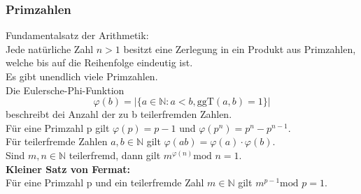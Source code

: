 \documentclass[a4paper,12pt]{article}
\begin{document}
\subsubsection{Primzahlen}
Fundamentalsatz der Arithmetik:\\
Jede natürliche Zahl $n>1$ besitzt eine Zerlegung in ein Produkt aus Primzahlen, welche bis auf die Reihenfolge eindeutig ist.\\
Es gibt unendlich viele Primzahlen.\\

Die Eulersche-Phi-Funktion $$\varphi (b)=|\{a\in\mathbb{N} : a < b, \textrm{ggT}(a,b)=1\}|$$ beschreibt dei Anzahl der zu b teilerfremden Zahlen.\\
Für eine Primzahl p gilt $\varphi (p)=p-1$ und $\varphi (p^n)=p^n-p^{n-1}$.\\
Für teilerfremde Zahlen $a,b\in \mathbb{N}$ gilt $\varphi (ab)=\varphi (a)\cdot \varphi (b)$.\\
Sind $m,n\in \mathbb{N}$ teilerfremd, dann gilt $m^{\varphi (n)}\textrm{mod }n= 1$.\\
\textbf{Kleiner Satz von Fermat:}\\
Für eine Primzahl p und ein teilerfremde Zahl $m\in \mathbb{N}$ gilt $m^{p-1} \textrm{mod }p = 1$.
\end{document}

